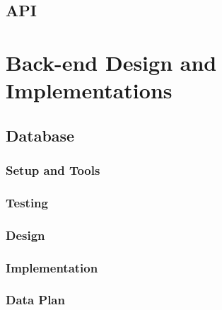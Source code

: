\subsection{API}
\label{subsec:subsec01}


\section{Back-end Design and Implementations}
\label{sec:sec03}

\subsection{Database}
\label{subsec:database}

\subsubsection{Setup and Tools}
\label{subsubsec:dbsetup}


\subsubsection{Testing}
\label{subsubsec:dbtesting}


\subsubsection{Design}
\label{subsubsec:dbdesign}


\subsubsection{Implementation}
\label{subsubsec:dbimplementation}


\subsubsection{Data Plan}
\label{subsubsec:dbdataplan}


